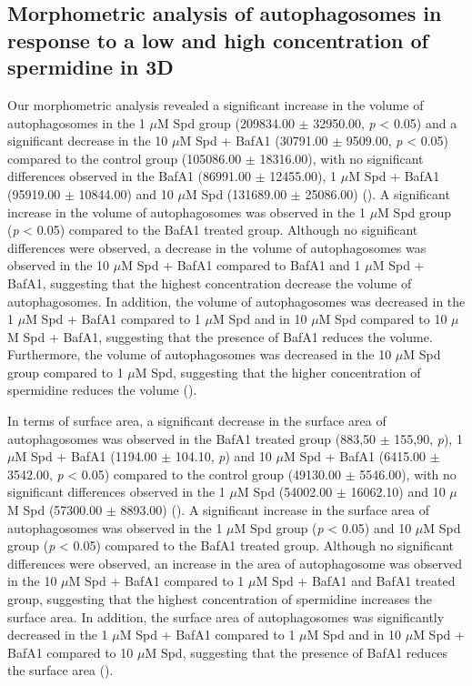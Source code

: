 \subsection{Morphometric analysis of autophagosomes  in response to a low and high concentration of spermidine in 3D}
Our morphometric analysis revealed a significant increase in the volume of autophagosomes in the 1 $\mu$M Spd group (209834.00 $\pm$ 32950.00, \textit{p} < 0.05) and a significant decrease in the 10 $\mu$M Spd + BafA1 (30791.00 $\pm$ 9509.00, \textit{p} < 0.05) compared to the control group (105086.00 $\pm$ 18316.00), with no significant differences observed in the BafA1 (86991.00 $\pm$ 12455.00), 1 $\mu$M Spd + BafA1 (95919.00 $\pm$ 10844.00) and 10 $\mu$M Spd (131689.00 $\pm$ 25086.00) (). A significant increase in the volume of autophagosomes was observed in the 1 $\mu$M Spd group (\textit{p} < 0.05) compared to the BafA1 treated group. Although no significant differences were observed, a decrease in the volume of autophagosomes was observed in the 10 $\mu$M Spd + BafA1 compared to BafA1 and 1 $\mu$M Spd + BafA1, suggesting that the highest concentration decrease the volume of autophagosomes. In addition, the volume of autophagosomes was decreased in the 1 $\mu$M Spd + BafA1 compared to 1 $\mu$M Spd and in 10 $\mu$M Spd  compared to 10 $\mu$M Spd + BafA1, suggesting that the presence of BafA1 reduces the volume. Furthermore, the volume of autophagosomes was decreased in the 10 $\mu$M Spd group compared to 1 $\mu$M Spd, suggesting that the higher concentration of spermidine reduces the volume (). 

In terms of surface area, a significant decrease in the surface area of autophagosomes was observed in the BafA1 treated group (883,50 $\pm$ 155,90, \textit{p}), 1 $\mu$M Spd + BafA1 (1194.00 $\pm$ 104.10, \textit{p}) and 10 $\mu$M Spd + BafA1 (6415.00 $\pm$ 3542.00, \textit{p} < 0.05) compared to the control group (49130.00 $\pm$ 5546.00), with no significant differences observed in the 1 $\mu$M Spd (54002.00 $\pm$ 16062.10) and 10 $\mu$M Spd (57300.00 $\pm$ 8893.00) (). A significant increase in the surface area of autophagosomes was observed in the 1 $\mu$M Spd group (\textit{p} < 0.05) and 10 $\mu$M Spd group (\textit{p} < 0.05) compared to the BafA1 treated group. Although no significant differences were observed, an increase in the area of autophagosome was observed in the 10 $\mu$M Spd + BafA1 compared to 1 $\mu$M Spd + BafA1 and BafA1 treated group, suggesting that the highest concentration of spermidine increases the surface area. In addition, the surface area of autophagosomes was significantly decreased in the 1 $\mu$M Spd + BafA1 compared to 1 $\mu$M Spd and in 10 $\mu$M Spd + BafA1 compared to 10 $\mu$M Spd, suggesting that the presence of BafA1 reduces the surface area (). 

